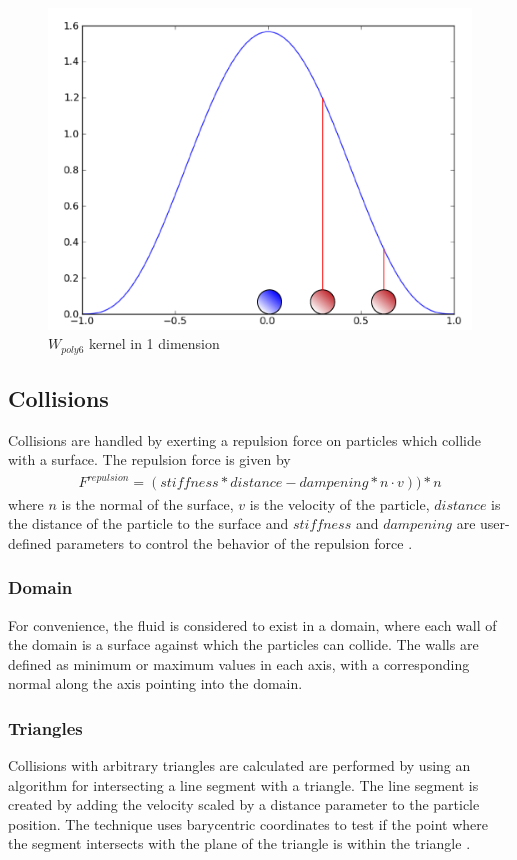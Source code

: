 \begin{figure}[!htc]
 		\centering
		\includegraphics[scale=0.6]{figures/poly6kernel.png}
        \caption{ $W_{poly6}$ kernel in 1 dimension }
		\label{fig:poly6kernel}
\end{figure}


\subsection{Collisions}

Collisions are handled by exerting a repulsion force on particles which collide
with a surface. The repulsion force is given by
\begin{align}
F^{repulsion} = (stiffness * distance - dampening * n \cdot v))*n
\end{align}
where $n$ is the normal of the surface, $v$ is the velocity of the particle,
$distance$ is the distance of the particle to the surface and
$stiffness$ and $dampening$ are user-defined parameters to control the behavior of
the repulsion force \cite{Krog2010}.

\subsubsection{Domain}
For convenience, the fluid is considered to exist in a domain, where each wall
of the domain is a surface against which the particles can collide. The walls
are defined as minimum or maximum values in each axis, with a corresponding
normal along the axis pointing into the domain. 

\subsubsection{Triangles} 
Collisions with arbitrary triangles are calculated
are performed by using an algorithm for intersecting a line segment with a
triangle.  The line segment is created by adding the velocity scaled by a
distance parameter to the particle position. The technique uses barycentric
coordinates to test if the point where the segment intersects with the plane of
the triangle is within the triangle \cite{Ericson}.


